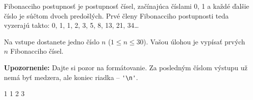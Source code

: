 




Fibonacciho postupnosť je postupnosť čísel, začínajúca číslami 0, 1 a každé ďalšie číslo je súčtom
dvoch predošlých.  Prvé členy Fibonacciho postupnosti teda vyzerajú takto: 0, 1, 1, 2, 3, 5, 8, 13,
21, 34\dots

Na vstupe dostanete jedno číslo $n$ ($1\leq n\leq 30$). Vašou úlohou je vypísať prvých $n$
Fibonacciho čísel.

\textbf{Upozornenie:} Dajte si pozor na formátovanie. Za posledným číslom výstupu už nemá byť
medzera, ale koniec riadka -- \verb!'\n'!.

 1 1 2 3
\koniec


